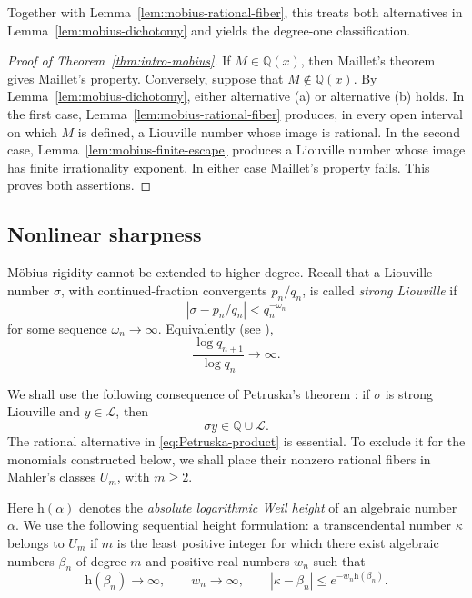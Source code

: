 \documentclass[11pt]{amsart}
\numberwithin{equation}{section}
\theoremstyle{definition}
\theoremstyle{remark}
\newcommand{\Q}{\mathbb Q}
\newcommand{\Lio}{\mathscr L}
\newcommand{\abs}[1]{\left\lvert #1\right\rvert}
\begin{document}
Together with Lemma~\ref{lem:mobius-rational-fiber}, this treats both
alternatives in Lemma~\ref{lem:mobius-dichotomy} and yields the
degree-one classification.

\begin{proof}[Proof of Theorem~\ref{thm:intro-mobius}]
If \(M\in\Q(x)\), then Maillet's theorem gives Maillet's property.
Conversely, suppose that \(M\notin\Q(x)\). By
Lemma~\ref{lem:mobius-dichotomy}, either alternative \textup{(a)} or
alternative \textup{(b)} holds. In the first case,
Lemma~\ref{lem:mobius-rational-fiber} produces, in every open interval
on which \(M\) is defined, a Liouville number whose image is rational.
In the second case, Lemma~\ref{lem:mobius-finite-escape} produces a
Liouville number whose image has finite irrationality exponent. In
either case Maillet's property fails. This proves both assertions.
\end{proof}

\subsection{Nonlinear sharpness}
\label{subsec:nonlinear-sharpness}

M\"obius rigidity cannot be extended to higher degree. Recall that a
Liouville number \(\sigma\), with continued-fraction convergents
\(p_n/q_n\), is called \emph{strong Liouville} if
\[
\abs{\sigma-p_n/q_n}<q_n^{-\omega_n}
\]
for some sequence \(\omega_n\to\infty\).
Equivalently (see \cite{Petruska1992}),
\begin{equation}\label{eq:strong-convergent-criterion}
\frac{\log q_{n+1}}{\log q_n}\longrightarrow\infty.
\end{equation}

We shall use the following consequence of Petruska's theorem
\cite[Theorem~1]{Petruska1992}: if $\sigma$ is strong Liouville
and $y\in\Lio$, then
\begin{equation}\label{eq:Petruska-product}
\sigma y\in\Q\cup\Lio.
\end{equation}
The rational alternative in \eqref{eq:Petruska-product} is essential.
To exclude it for the monomials constructed below, we shall place their
nonzero rational fibers in Mahler's classes \(U_m\), with \(m\geq2\).

Here $\mathrm h(\alpha)$ denotes the \emph{absolute logarithmic Weil
height} of an algebraic number $\alpha$. We use the following
sequential height formulation: a transcendental number $\kappa$
belongs to $U_m$ if $m$ is the least positive integer for which there
exist algebraic numbers $\beta_n$ of degree $m$ and positive real
numbers $w_n$ such that
\[
\mathrm h(\beta_n)\to\infty,\qquad
w_n\to\infty,\qquad
|\kappa-\beta_n|
\leq e^{-w_n\mathrm h(\beta_n)}.
\]
\end{document}
